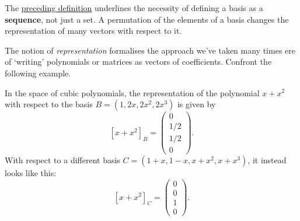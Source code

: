 \begin{remark}{}{}
 The \hyperref[def:representation-of-a-vector]{preceding definition} underlines
 the necessity of defining a basis as a \textbf{sequence}, not just a set. A
 permutation of the elements of a basis changes the representation of many
 vectors with respect to it.
\end{remark}

The notion of \emph{representation} formalises the approach we've taken many
times ere of `writing' polynomials or matrices as vectors of coefficients.
Confront the following example. 

\begin{example}{}{}
 In the space of cubic polynomials, the representation of the polynomial $x +
 x^2$ with respect to the basis $B = (1, 2x, 2x^2, 2x^3)$ is given by
 \[
  [x + x^2]_B = 
  \begin{pmatrix}
   0\\
   1 / 2\\
   1 / 2\\
   0  
  \end{pmatrix}.
 \]
 With respect to a different basis $C = (1 + x, 1 - x, x + x^2, x + x^3)$, it
 instead looks like this:
 \[
  [x + x^2]_C = 
  \begin{pmatrix}
   0\\
   0\\
   1\\
   0
  \end{pmatrix}.
 \]
\end{example}

